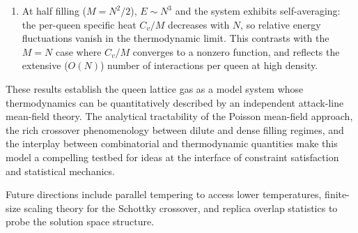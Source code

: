 \documentclass[aps, pre, reprint, amsmath, amssymb, superscriptaddress, floatfix]{revtex4-2}
\begin{document}
\begin{enumerate}
\item At half filling ($M = N^2/2$), $E \sim N^3$ and the system
  exhibits self-averaging: the per-queen specific heat $C_v/M$
  decreases with $N$, so relative energy fluctuations vanish in the
  thermodynamic limit.  This contrasts with the $M = N$ case where
  $C_v/M$ converges to a nonzero function, and reflects the
  extensive ($O(N)$) number of interactions per queen at high density.

\end{enumerate}

These results establish the queen lattice gas as a model system whose
thermodynamics can be quantitatively described by an independent
attack-line mean-field theory.  The analytical tractability
of the Poisson mean-field approach, the rich crossover
phenomenology between dilute and dense filling regimes, and the
interplay between combinatorial and thermodynamic quantities make
this model a compelling testbed for ideas at the interface of
constraint satisfaction and statistical mechanics.

Future directions include parallel tempering to access lower
temperatures, finite-size scaling theory for the Schottky crossover,
and replica overlap statistics to probe the solution space structure.
\end{document}
